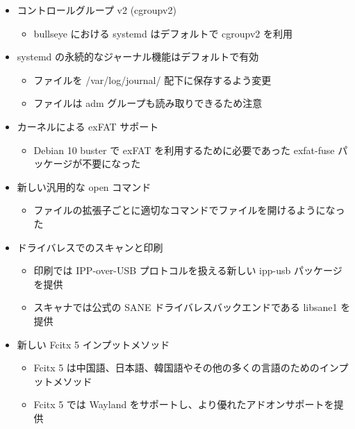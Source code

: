\documentclass[mingoth,a4paper]{jsarticle}
\begin{document}

\begin{itemize}
\item コントロールグループ v2 (cgroupv2)
  \begin{itemize}
  \item bullseye における systemd はデフォルトで cgroupv2 を利用
  \end{itemize}
\item systemd の永続的なジャーナル機能はデフォルトで有効
  \begin{itemize}
  \item ファイルを /var/log/journal/ 配下に保存するよう変更
  \item ファイルは adm グループも読み取りできるため注意
  \end{itemize}
\item カーネルによる exFAT サポート
  \begin{itemize}
  \item Debian 10 buster で exFAT を利用するために必要であった exfat-fuse パッケージが不要になった
  \end{itemize}
\item 新しい汎用的な open コマンド
  \begin{itemize}
  \item ファイルの拡張子ごとに適切なコマンドでファイルを開けるようになった
  \end{itemize}  
\end{itemize}
  




\begin{itemize}
\item ドライバレスでのスキャンと印刷
  \begin{itemize}
  \item 印刷では IPP-over-USB プロトコルを扱える新しい ipp-usb パッケージを提供
  \item スキャナでは公式の SANE ドライバレスバックエンドである libsane1 を提供 
  \end{itemize}
\item 新しい Fcitx 5 インプットメソッド
  \begin{itemize}
  \item Fcitx 5 は中国語、日本語、韓国語やその他の多くの言語のためのインプットメソッド
  \item Fcitx 5 では Wayland をサポートし、より優れたアドオンサポートを提供
  \end{itemize}
\end{itemize}
  
\end{document}
